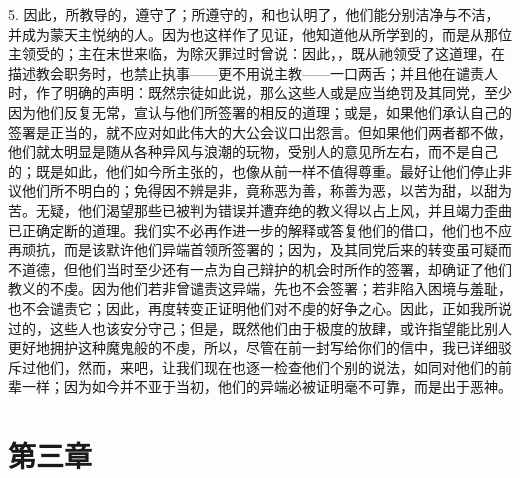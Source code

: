 5. 因此，所教导的，遵守了；所遵守的，和也认明了，他们能分别洁净与不洁，并成为蒙天主悦纳的人。因为也这样作了见证，他知道他从所学到的，而是从那位主领受的；主在末世来临，为除灭罪过时曾说：因此，，既从祂领受了这道理，在描述教会职务时，也禁止执事——更不用说主教——一口两舌；并且他在谴责人时，作了明确的声明：既然宗徒如此说，那么这些人或是应当绝罚及其同党，至少因为他们反复无常，宣认与他们所签署的相反的道理；或是，如果他们承认自己的签署是正当的，就不应对如此伟大的大公会议口出怨言。但如果他们两者都不做，他们就太明显是随从各种异风与浪潮的玩物，受别人的意见所左右，而不是自己的；既是如此，他们如今所主张的，也像从前一样不值得尊重。最好让他们停止非议他们所不明白的；免得因不辨是非，竟称恶为善，称善为恶，以苦为甜，以甜为苦。无疑，他们渴望那些已被判为错误并遭弃绝的教义得以占上风，并且竭力歪曲已正确定断的道理。我们实不必再作进一步的解释或答复他们的借口，他们也不应再顽抗，而是该默许他们异端首领所签署的；因为，及其同党后来的转变虽可疑而不道德，但他们当时至少还有一点为自己辩护的机会时所作的签署，却确证了他们教义的不虔。因为他们若非曾谴责这异端，先也不会签署；若非陷入困境与羞耻，也不会谴责它；因此，再度转变正证明他们对不虔的好争之心。因此，正如我所说过的，这些人也该安分守己；但是，既然他们由于极度的放肆，或许指望能比别人更好地拥护这种魔鬼般的不虔，所以，尽管在前一封写给你们的信中，我已详细驳斥过他们，然而，来吧，让我们现在也逐一检查他们个别的说法，如同对他们的前辈一样；因为如今并不亚于当初，他们的异端必被证明毫不可靠，而是出于恶神。\par


\section{第三章 }

